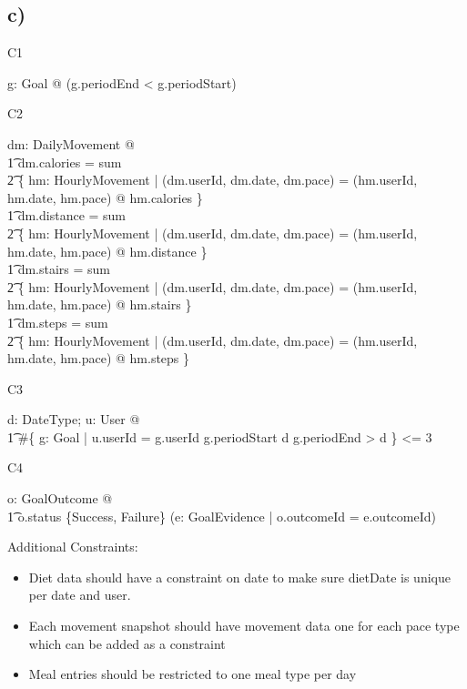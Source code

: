 \documentclass{article}
\begin{document}
\subsection*{\small c)}

C1
\begin{zed}
\forall g: Goal @ \lnot (g.periodEnd < g.periodStart) \\
\end{zed}
C2
\begin{zed}
\forall dm: DailyMovement @ \\
    \t1 dm.calories = sum \\
    \t2 \{ hm: HourlyMovement | (dm.userId, dm.date, dm.pace) = (hm.userId, hm.date, hm.pace) @ hm.calories \} \\
    \t1 dm.distance = sum \\
    \t2 \{ hm: HourlyMovement | (dm.userId, dm.date, dm.pace) = (hm.userId, hm.date, hm.pace) @ hm.distance \} \\
    \t1 dm.stairs = sum \\
    \t2 \{ hm: HourlyMovement | (dm.userId, dm.date, dm.pace) = (hm.userId, hm.date, hm.pace) @ hm.stairs \} \\
    \t1 dm.steps = sum \\
    \t2 \{ hm: HourlyMovement | (dm.userId, dm.date, dm.pace) = (hm.userId, hm.date, hm.pace) @ hm.steps \} \\
\end{zed}
C3
\begin{zed}
\forall d: DateType; u: User @ \\
    \t1 \#\{ g: Goal | u.userId = g.userId \land g.periodStart \leq d \land g.periodEnd > d \} <= 3 \\
\end{zed}
C4
\begin{zed}
\forall o: GoalOutcome @ \\ 
    \t1 o.status \in \{Success, Failure\} \implies (\exists e: GoalEvidence | o.outcomeId = e.outcomeId) \\
\end{zed}
Additional Constraints:
\begin{itemize}
  \item Diet data should have a constraint on date to make sure dietDate is unique per date and user. 
  \item Each movement snapshot should have movement data one for each pace type which can be added as a constraint 
  \item Meal entries should be restricted to one meal type per day 
\end{itemize}
\end{document}
